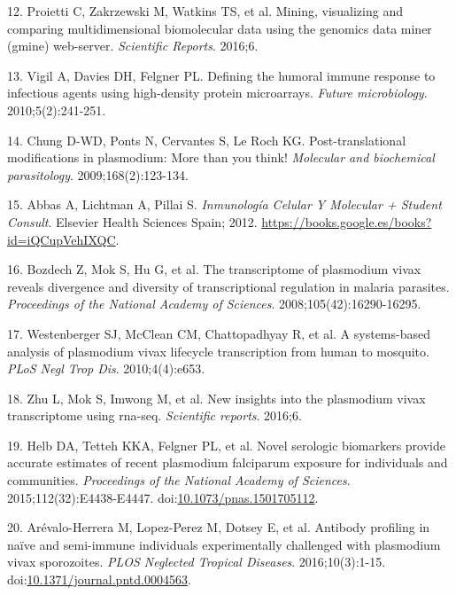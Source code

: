 \documentclass[]{article}
\begin{document}
\hypertarget{ref-gmine2016}{}
12. Proietti C, Zakrzewski M, Watkins TS, et al. Mining, visualizing and
comparing multidimensional biomolecular data using the genomics data
miner (gmine) web-server. \emph{Scientific Reports}. 2016;6.

\hypertarget{ref-vigil2010}{}
13. Vigil A, Davies DH, Felgner PL. Defining the humoral immune response
to infectious agents using high-density protein microarrays.
\emph{Future microbiology}. 2010;5(2):241-251.

\hypertarget{ref-leroch2009postmod}{}
14. Chung D-WD, Ponts N, Cervantes S, Le Roch KG. Post-translational
modifications in plasmodium: More than you think! \emph{Molecular and
biochemical parasitology}. 2009;168(2):123-134.

\hypertarget{ref-abbas2012}{}
15. Abbas A, Lichtman A, Pillai S. \emph{Inmunología Celular Y Molecular
+ Student Consult}. Elsevier Health Sciences Spain; 2012.
\url{https://books.google.es/books?id=iQCupVehIXQC}.

\hypertarget{ref-bozdech2008}{}
16. Bozdech Z, Mok S, Hu G, et al. The transcriptome of plasmodium vivax
reveals divergence and diversity of transcriptional regulation in
malaria parasites. \emph{Proceedings of the National Academy of
Sciences}. 2008;105(42):16290-16295.

\hypertarget{ref-westenberger2010}{}
17. Westenberger SJ, McClean CM, Chattopadhyay R, et al. A systems-based
analysis of plasmodium vivax lifecycle transcription from human to
mosquito. \emph{PLoS Negl Trop Dis}. 2010;4(4):e653.

\hypertarget{ref-bozdech2016}{}
18. Zhu L, Mok S, Imwong M, et al. New insights into the plasmodium
vivax transcriptome using rna-seq. \emph{Scientific reports}. 2016;6.

\hypertarget{ref-Helb2015exposure}{}
19. Helb DA, Tetteh KKA, Felgner PL, et al. Novel serologic biomarkers
provide accurate estimates of recent plasmodium falciparum exposure for
individuals and communities. \emph{Proceedings of the National Academy
of Sciences}. 2015;112(32):E4438-E4447.
doi:\href{https://doi.org/10.1073/pnas.1501705112}{10.1073/pnas.1501705112}.

\hypertarget{ref-arevalo2016}{}
20. Arévalo-Herrera M, Lopez-Perez M, Dotsey E, et al. Antibody
profiling in naïve and semi-immune individuals experimentally challenged
with plasmodium vivax sporozoites. \emph{PLOS Neglected Tropical
Diseases}. 2016;10(3):1-15.
doi:\href{https://doi.org/10.1371/journal.pntd.0004563}{10.1371/journal.pntd.0004563}.
\end{document}
